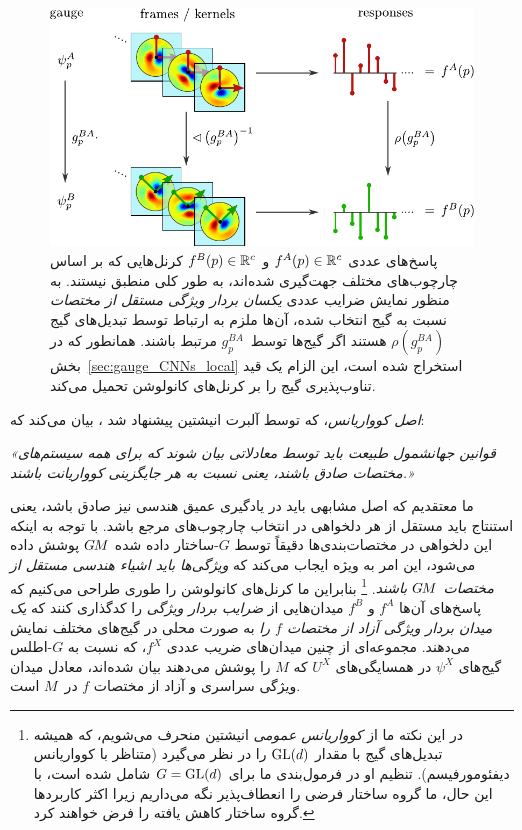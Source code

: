 \begin{figure}
	\centering
	\includegraphics[width=.75\columnwidth]{figures/kernel_responses.pdf}
	\vspace*{1ex}
	\caption{\small
		پاسخ‌های عددی $f^A(p) \in\mathbb{R}^c$ و $f^B(p) \in\mathbb{R}^c$ کرنل‌هایی که بر اساس چارچوب‌های مختلف جهت‌گیری شده‌اند، به طور کلی منطبق نیستند.
		به منظور نمایش ضرایب عددی \emph{یکسان بردار ویژگی مستقل از مختصات} نسبت به گیج انتخاب شده، آن‌ها ملزم به ارتباط توسط تبدیل‌های گیج $\rho(g_p^{BA})$ هستند اگر گیج‌ها توسط~$g_p^{BA}$ مرتبط باشند.
		همانطور که در بخش~\ref{sec:gauge_CNNs_local} استخراج شده است، این الزام یک قید تناوب‌پذیری گیج را بر کرنل‌های کانولوشن تحمیل می‌کند.
	}
	\label{fig:gauge_trafos_feature_vector}
\end{figure}
		
		\begin{minipage}{\textwidth}
			\emph{اصل کوواریانس}، که توسط آلبرت انیشتین پیشنهاد شد \cite{Einstein1916German,Einstein1916English}، بیان می‌کند که:
			\vspace*{1.ex}
			\begin{center}
				\it
				«قوانین جهانشمول طبیعت باید توسط معادلاتی بیان شوند که برای همه سیستم‌های
				\\
				مختصات صادق باشند، یعنی نسبت به هر جایگزینی کوواریانت باشند.»
			\end{center}
			\vspace*{1.ex}
		\end{minipage}
		ما معتقدیم که اصل مشابهی باید در یادگیری عمیق هندسی نیز صادق باشد، یعنی استنتاج باید مستقل از هر دلخواهی در انتخاب چارچوب‌های مرجع باشد.
		با توجه به اینکه این دلخواهی در مختصات‌بندی‌ها دقیقاً توسط $G$-ساختار داده شده $G\mkern-1.4muM$ پوشش داده می‌شود، این امر به ویژه ایجاب می‌کند که \emph{ویژگی‌ها باید اشیاء هندسی مستقل از مختصات $G\mkern-1.4muM$ باشند}.%
		\footnote{
			در این نکته ما از \emph{کوواریانس عمومی} انیشتین منحرف می‌شویم، که همیشه تبدیل‌های گیج با مقدار $\operatorname{GL}(d)$ را در نظر می‌گیرد (متناظر با کوواریانس دیفئومورفیسم).
			تنظیم او در فرمول‌بندی ما برای $G=\operatorname{GL}(d)$ شامل شده است، با این حال، ما گروه ساختار فرضی را انعطاف‌پذیر نگه می‌داریم زیرا اکثر کاربردها گروه ساختار کاهش یافته را فرض خواهند کرد.
		}
		بنابراین ما کرنل‌های کانولوشن را طوری طراحی می‌کنیم که پاسخ‌های آن‌ها $f^A$ و $f^B$ میدان‌هایی از \emph{ضرایب بردار ویژگی} را کدگذاری کنند که \emph{یک میدان بردار ویژگی آزاد از مختصات $f$ را} به صورت محلی در گیج‌های مختلف نمایش می‌دهند.
		مجموعه‌ای از چنین میدان‌های ضریب عددی $f^X$، که نسبت به $G$-اطلس گیج‌های $\psi^X$ در همسایگی‌های $U^X$ که $M$ را پوشش می‌دهند بیان شده‌اند، معادل میدان ویژگی سراسری و آزاد از مختصات $f$ در~$M$ است.
		
